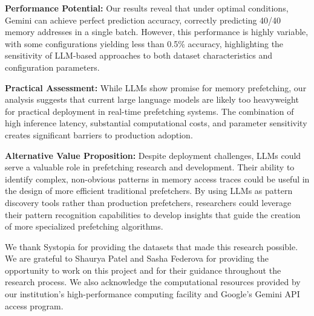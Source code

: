 \documentclass[sigconf,authorversion,nonacm]{acmart}
\begin{document}
\textbf{Performance Potential:} Our results reveal that under optimal conditions, Gemini can achieve perfect prediction accuracy, correctly predicting 40/40 memory addresses in a single batch. However, this performance is highly variable, with some configurations yielding less than 0.5\% accuracy, highlighting the sensitivity of LLM-based approaches to both dataset characteristics and configuration parameters.

\textbf{Practical Assessment:} While LLMs show promise for memory prefetching, our analysis suggests that current large language models are likely too heavyweight for practical deployment in real-time prefetching systems. The combination of high inference latency, substantial computational costs, and parameter sensitivity creates significant barriers to production adoption.

\textbf{Alternative Value Proposition:} Despite deployment challenges, LLMs could serve a valuable role in prefetching research and development. Their ability to identify complex, non-obvious patterns in memory access traces could be useful in the design of more efficient traditional prefetchers. By using LLMs as pattern discovery tools rather than production prefetchers, researchers could leverage their pattern recognition capabilities to develop insights that guide the creation of more specialized prefetching algorithms.



\begin{acks}
We thank Systopia for providing the datasets that made this research possible. We are grateful to Shaurya Patel and Sasha Federova for providing the opportunity to work on this project and for their guidance throughout the research process. We also acknowledge the computational resources provided by our institution's high-performance computing facility and Google's Gemini API access program.
\end{acks}



\end{document}
